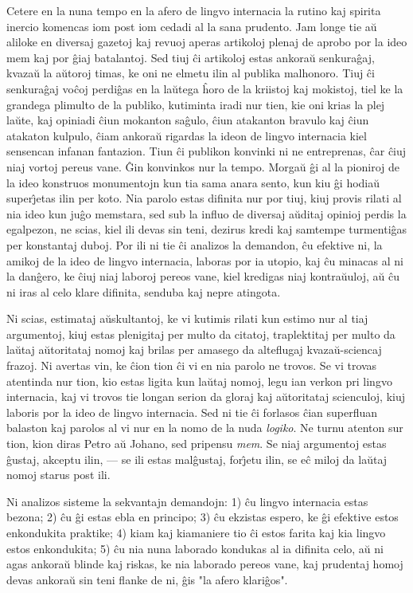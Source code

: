    Cetere en la nuna tempo en la afero de lingvo internacia la rutino
kaj spirita inercio komencas iom post iom cedadi al la sana
prudento. Jam longe tie a\u u aliloke en diversaj gazetoj kaj revuoj
aperas artikoloj plenaj de aprobo por la ideo mem kaj por \^giaj
batalantoj. Sed tiuj \^ci artikoloj estas ankora\u u senkura\^gaj,
kvaza\u u la a\u utoroj timas, ke oni ne elmetu ilin al publika
malhonoro. Tiuj \^ci senkura\^gaj vo\^coj perdi\^gas en la la\u
utega \^horo de la kriistoj kaj mokistoj, tiel ke la grandega
plimulto de la publiko, kutiminta iradi nur tien, kie oni krias la
plej la\u ute, kaj opiniadi \^ciun mokanton sa\^gulo, \^ciun
atakanton bravulo kaj \^ciun atakaton kulpulo, \^ciam ankora\u u
rigardas la ideon de lingvo internacia kiel sensencan infanan
fantazion. Tiun \^ci publikon konvinki ni ne entreprenas, \^car
\^ciuj niaj vortoj pereus vane. \^Gin konvinkos nur la tempo.
Morga\u u \^gi al la pioniroj de la ideo konstruos monumentojn kun
tia sama anara sento, kun kiu \^gi hodia\u u super\^{\j}etas ilin
per koto. Nia parolo estas difinita nur por tiuj, kiuj provis rilati
al nia ideo kun ju\^go memstara, sed sub la influo de diversaj a\u
uditaj opinioj perdis la egalpezon, ne scias, kiel ili devas sin
teni, dezirus kredi kaj samtempe turmenti\^gas per konstantaj duboj.
Por ili ni tie \^ci analizos la demandon, \^cu efektive ni, la
amikoj de la ideo de lingvo internacia, laboras por ia utopio, kaj
\^cu minacas al ni la dan\^gero, ke \^ciuj niaj laboroj pereos vane,
kiel kredigas niaj kontra\u uuloj, a\u u \^cu ni iras al celo klare
difinita, senduba kaj nepre atingota.

   Ni scias, estimataj a\u uskultantoj, ke vi kutimis rilati kun estimo
nur al tiaj argumentoj, kiuj estas plenigitaj per multo da citatoj,
traplektitaj per multo da la\u utaj a\u utoritataj nomoj kaj brilas
per amasego da alteflugaj kvaza\u u-sciencaj frazoj. Ni avertas vin,
ke \^cion tion \^ci vi en nia parolo ne trovos. Se vi trovas
atentinda nur tion, kio estas ligita kun la\u utaj nomoj, legu ian
verkon pri lingvo internacia, kaj vi trovos tie longan serion da
gloraj kaj a\u utoritataj scienculoj, kiuj laboris por la ideo de
lingvo internacia. Sed ni tie \^ci forlasos \^cian superfluan
balaston kaj parolos al vi nur en la nomo de la nuda {\sl logiko}.
Ne turnu atenton sur tion, kion diras Petro a\u u Johano, sed
pripensu {\sl mem}. Se niaj argumentoj estas \^gustaj, akceptu ilin,
--- se ili estas mal\^gustaj, for\^{\j}etu ilin, se e\^c miloj da
la\u utaj nomoj starus post ili.

   Ni analizos sisteme la sekvantajn demandojn: 1) \^cu lingvo
internacia estas bezona; 2) \^cu \^gi estas ebla en principo; 3)
\^cu ekzistas espero, ke \^gi efektive estos enkondukita praktike;
4) kiam kaj kiamaniere tio \^ci estos farita kaj kia lingvo estos
enkondukita; 5) \^cu nia nuna laborado kondukas al ia difinita celo,
a\u u ni agas ankora\u u blinde kaj riskas, ke nia laborado pereos
vane, kaj prudentaj homoj devas ankora\u u sin teni flanke de ni,
\^gis "la afero klari\^gos".

